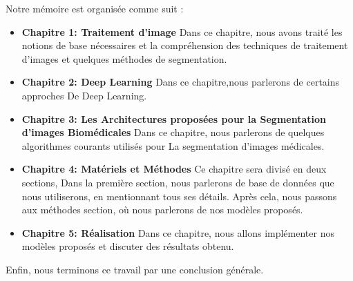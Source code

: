 Notre mémoire est organisée comme suit :
\newline
\begin{itemize}


\item \textbf{Chapitre 1: Traitement d'image}\newline
Dans ce chapitre, nous avons traité les notions de base nécessaires et la compréhension des techniques de traitement d’images et quelques méthodes de segmentation.\newline

\item \textbf{Chapitre 2: Deep Learning}\newline
Dans ce chapitre,nous parlerons de certains approches De Deep Learning.\newline

\item \textbf{Chapitre 3: Les Architectures proposées pour la Segmentation d’images Biomédicales}\newline
Dans ce chapitre, nous parlerons de quelques algorithmes courants utilisés pour La segmentation d'images médicales.
\newline
\item  \textbf{Chapitre 4: Matériels et Méthodes}\newline
Ce chapitre sera divisé en deux sections, Dans la première section, nous parlerons de base de données que nous utiliserons, en mentionnant tous ses détails. Après cela, nous passons aux méthodes section, où nous parlerons de nos modèles proposés.
\newline 

\item  \textbf{Chapitre 5: Réalisation}\newline
Dans ce chapitre, nous allons implémenter nos modèles proposés et discuter des résultats
obtenu.

\end{itemize}
\vspace{1cm}
Enfin, nous terminons ce travail par une conclusion générale.



